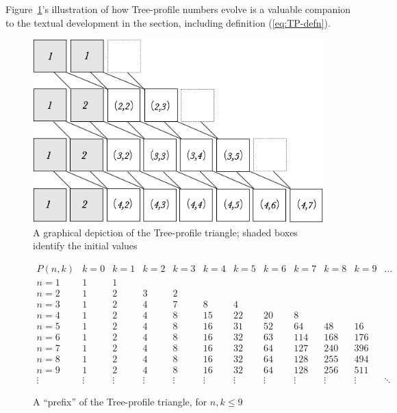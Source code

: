 Figure~\ref{Fig:treeprofile}'s illustration of how Tree-profile numbers evolve is a valuable companion to the textual development in the section, including definition (\ref{eq:TP-defn}).
\begin{figure}[htb]
\begin{center}
        \includegraphics[scale=0.35]{FiguresMaths/TreeProfile}
        \caption{A graphical depiction of the Tree-profile triangle; shaded boxes identify the initial values}
        \label{Fig:treeprofile}
\end{center}
\end{figure}

\begin{figure}[htb]
\[
\begin{array}{c||r|r|r|r|r|r|r|r|r|r|r}
P(n, k) & k=0 & k=1 & k=2 & k=3 & k=4 & k=5 & k=6 & k=7 & k=8 & k=9 & \ldots \\
\hline
\hline
n=1 &  1 &  1 &    &    &     &     &     &     &     &     \\
\hline
n=2 &  1 &  2 &  3 &  2 &     &     &     &     &     &     \\
\hline
n=3 &  1 &  2 &  4 &  7 &   8 &   4 &     &     &     &     \\
\hline
n=4 &  1 &  2 &  4 &  8 &  15 &  22 &  20 &   8 &     &     \\
\hline
n=5 &  1 &  2 &  4 &  8 &  16 &  31 &  52 &  64 & 48  &  16 \\
\hline
n=6 &  1 &  2 &  4 &  8 &  16 &  32 &  63 & 114 & 168 & 176 \\
\hline
n=7 &  1 &  2 &  4 &  8 &  16 &  32 &  64 & 127 & 240 & 396 \\
\hline
n=8 &  1 &  2 &  4 &  8 &  16 &  32 &  64 & 128 & 255 & 494 \\
\hline
n=9 &  1 &  2 &  4 &  8 &  16 &  32 &  64 & 128 & 256 & 511 \\
\hline
\vdots &\vdots &\vdots &\vdots &\vdots &\vdots &\vdots &\vdots &\vdots
&\vdots &\vdots &\ddots
\end{array}
\] 
\caption{A ``prefix'' of the Tree-profile triangle, for $n,k \leq 9$}
\label{fig:TP-triangle}
\end{figure}


